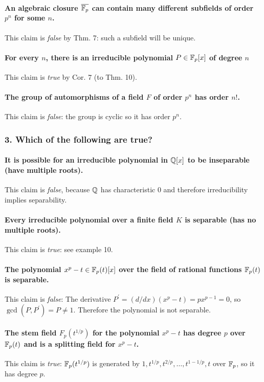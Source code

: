 \paragraph*{An algebraic closure $\overline{\mathbb{F}_p}$ can contain many different subfields of order $p^n$ for some $n$.}
This claim is \emph{false} by Thm. 7: such a subfield will be unique.

\paragraph*{For every $n$, there is an irreducible polynomial $P \in \mathbb{F}_p[x]$ of degree $n$}
This claim is \emph{true} by Cor. 7 (to Thm. 10).

\paragraph*{The group of automorphisms of a field $F$ of order $p^n$ has order $n!$.}
This claim is \emph{false}: the group is cyclic so it has order $p^n$.

\subsubsection*{3. Which of the following are true?}
\paragraph*{It is possible for an irreducible polynomial in $\mathbb{Q}[x]$ to be inseparable (have multiple roots).}
This claim is \emph{false}, because $\mathbb{Q}$ has characteristic $0$ and therefore irreducibility implies separability.

\paragraph*{Every irreducible polynomial over a finite field $K$ is separable (has no multiple roots).}
This claim is \emph{true}: see example 10.

\paragraph*{The polynomial $x^p - t \in \mathbb{F}_p(t)[x]$ over the field of rational functions $\mathbb{F}_p(t)$ is separable.}
This claim is \emph{false}: The derivative $P^\prime = (d/dx)(x^p - t) = p x^{p-1} = 0$, so $\gcd(P, P^\prime) = P \neq 1$. Therefore the polynomial is not separable.

\paragraph*{The stem field $F_p(t^{1/p})$ for the polynomial $x^p - t$ has degree $p$ over $\mathbb{F}_p(t)$ and is a splitting field for $x^p - t$.}
This claim is \emph{true}: $\mathbb{F}_p(t^{1/p})$ is generated by $1, t^{1/p}, t^{2/p}, \dotsc, t^{1 - 1/p}, t$ over $\mathbb{F}_p$, so it has degree $p$.

